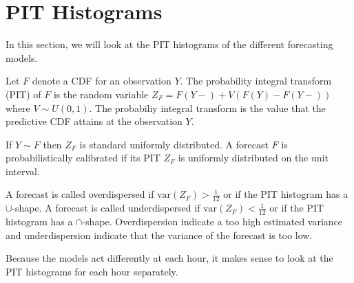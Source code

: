 \section{PIT Histograms}

In this section, we will look at the PIT histograms of the different forecasting models. 

Let \(F\) denote a CDF for an observation \(Y\). The probability integral 
transform (PIT) of \(F\) is the random variable \(Z_F = F(Y-) + V(F(Y) - F(Y-))\) 
where \(V \sim U(0,1)\). 
The probabiliy integral transform is the value that the predictive CDF 
attains at the observation \(Y\). 

If \(Y \sim F\) then \(Z_F\) is standard uniformly distributed. 
A forecast \(F\) is probabilistically calibrated if its PIT \(Z_F\) 
is uniformly distributed on the unit interval. 

A forecast is called overdispersed if \(\mathrm{var}(Z_F) > \frac{1}{12}\) or if 
the PIT histogram has a \(\cup\)-shape. A forecast is called underdispersed if 
\(\mathrm{var}(Z_F) < \frac{1}{12}\) or if the PIT histogram has a \(\cap\)-shape. 
Overdispersion indicate a too high estimated variance and underdispersion indicate 
that the variance of the forecast is too low.

Because the models act differently at each hour, it makes sense 
to look at the PIT histograms for each hour separately. 

